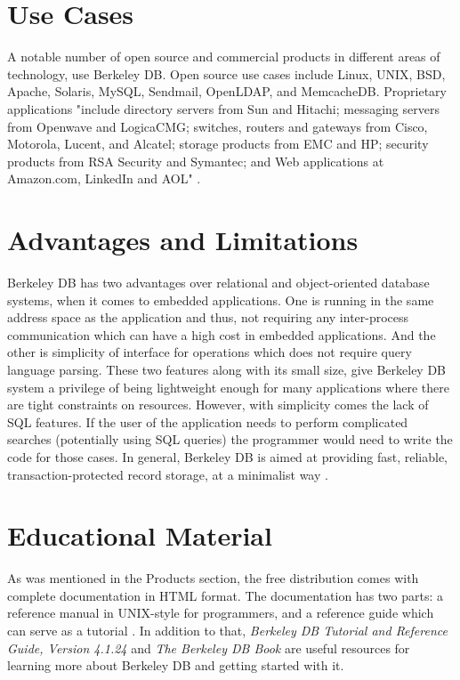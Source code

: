 \documentclass[9pt,twocolumn,twoside]{../../styles/osajnl}
\begin{document}
\section{Use Cases}
A notable number of open source and commercial products in different areas of technology, use Berkeley DB. 
Open source use cases include Linux, UNIX, BSD, Apache, Solaris, MySQL, Sendmail, OpenLDAP, and MemcacheDB.
\newline 
Proprietary applications "include directory servers from Sun and
Hitachi; messaging servers from Openwave and LogicaCMG; switches, routers and
gateways from Cisco, Motorola, Lucent, and Alcatel; storage products from EMC and
HP; security products from RSA Security and Symantec; and Web applications at
Amazon.com, LinkedIn and AOL" \cite{bdb-datasheet}.

\section{Advantages and Limitations}

Berkeley DB has two advantages over relational and object-oriented database systems, when it comes to embedded applications.
One is running in the same address space as the application and thus, not requiring any inter-process communication which 
can have a high cost in embedded applications. And the other is simplicity of interface for operations which does not require 
query language parsing. These two features along with its small size, give Berkeley DB system a privilege of being lightweight
enough for many applications where there are tight constraints on resources.
\newline
However, with simplicity comes the lack of SQL features. If the user of the application 
needs to perform complicated searches (potentially using SQL queries) the programmer would 
need to write the code for those cases. In general, Berkeley DB is aimed at providing fast, 
reliable, transaction-protected record storage, at a minimalist way \cite{stanford-need}.

\section{Educational Material}

As was mentioned in the Products section, the free distribution comes with complete 
documentation in HTML format. The documentation has two parts: a reference manual in UNIX-style for programmers,
and a reference guide which can serve as a tutorial \cite{olson1999berkeley}.
In addition to that, \emph{Berkeley DB Tutorial and Reference Guide, Version 4.1.24} 
\cite{stanford-web} and \emph{The Berkeley DB Book} \cite{yadava2007berkeley} are useful 
resources for learning more about Berkeley DB and getting started with it.
\end{document}
